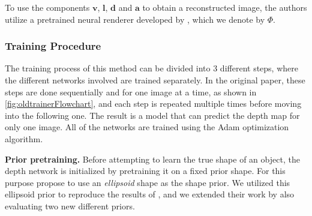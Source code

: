 To use the components $\mathbf{v}$, $\mathbf{l}$, $\mathbf{d}$ and  $\mathbf{a}$ to obtain a reconstructed image, the authors utilize a pretrained neural renderer developed by \cite{neural-renderer}, which we denote by $\Phi$.

\subsubsection{Training Procedure}
\label{sec:train}
The training process of this method can be divided into 3 different steps, where the different networks involved are trained separately. In the original paper, these steps are done sequentially and for one image at a time, as shown in \autoref{fig:oldtrainerFlowchart}, and each step is repeated multiple times before moving into the following one. The result is a model that can predict the depth map for only one image. All of the networks are trained using the Adam optimization algorithm.

\textbf{Prior pretraining.} Before attempting to learn the true shape of an object, the depth network is initialized by pretraining it on a fixed prior shape. 
For this purpose \cite{gan2shape} propose to use an \textit{ellipsoid} shape as the shape prior. 
We utilized this ellipsoid prior to reproduce the results of \cite{gan2shape}, and we extended their work by also evaluating two new different priors. 

